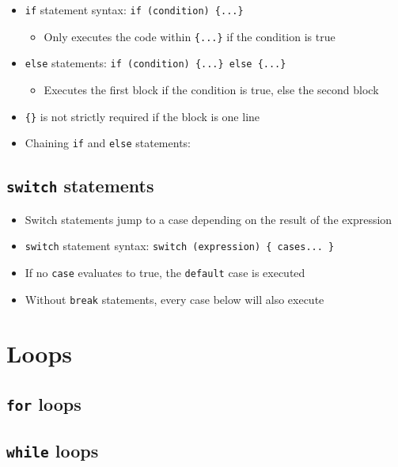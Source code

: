 \documentclass{article}
\begin{document}
\begin{itemize}
	\item \texttt{if} statement syntax: \texttt{if (condition) \{...\}}
	\begin{itemize}
		\item Only executes the code within \texttt{\{...\}} if the condition is true
	\end{itemize}
	\item \texttt{else} statements: \texttt{if (condition) \{...\} else \{...\}}
	\begin{itemize}
		\item Executes the first block if the condition is true, else the second block
	\end{itemize}
	\item \texttt{\{\}} is not strictly required if the block is one line
	
	\item Chaining \texttt{if} and \texttt{else} statements:
	
\end{itemize}

\subsection{\texttt{switch} statements}

\begin{itemize}
	\item Switch statements jump to a case depending on the result of the expression
	\item \texttt{switch} statement syntax: \texttt{switch (expression) \{ cases... \}}
	
	\item If no \texttt{case} evaluates to true, the \texttt{default} case is executed
	\item Without \texttt{break} statements, every case below will also execute
\end{itemize}

\section{Loops}

\subsection{\texttt{for} loops}

\subsection{\texttt{while} loops}
\end{document}
